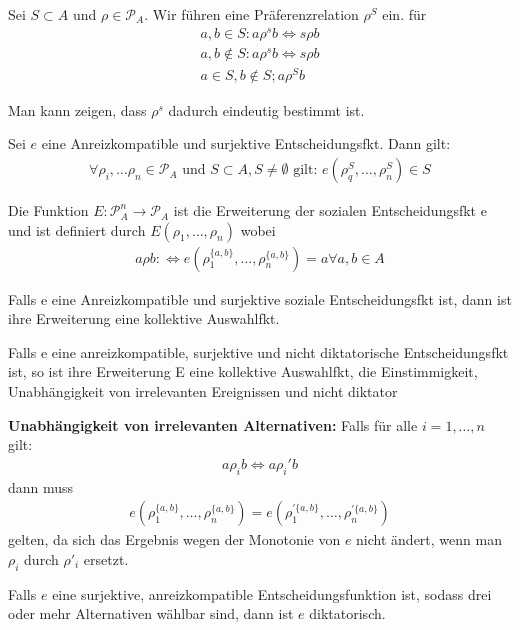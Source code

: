 \begin{defi}
	Sei $S \subset A$ und $\rho \in \mathcal{P}_A$. Wir führen eine Präferenzrelation $\rho^S$ ein. für 
	\begin{align*}
		a,b \in S: a \rho^s b \Leftrightarrow s \rho b \\
		a,b \notin S: a \rho^s b \Leftrightarrow s \rho b \\
		a \in S, b \notin S; a \rho^S b
	\end{align*}
\end{defi}
Man kann zeigen, dass $\rho^s$ dadurch eindeutig bestimmt ist. 

\begin{lem}
	Sei $e$ eine Anreizkompatible und surjektive Entscheidungsfkt. Dann gilt: 
	\begin{align*}
		\forall \rho_i, \dots \rho_n \in \mathcal{P}_A \text{ und } S \subset A, S \neq \emptyset \text{ gilt: } e(\rho_q^S, \dots, \rho_n^S) \in S
	\end{align*}
\end{lem}

\begin{defi}
	Die Funktion $E: \mathcal{P}_A^n \rightarrow \mathcal{P}_A$ ist die Erweiterung der sozialen Entscheidungsfkt e und ist definiert durch $E(\rho_1, \dots, \rho_n)$ wobei 
	\begin{align*}
		a \rho b : \Leftrightarrow e(\rho_1^{\{a,b\}} , \dots, \rho_n^{\{a,b\}})=a \forall a,b \in A
	\end{align*}
\end{defi}

\begin{lem}
	Falls e eine Anreizkompatible und surjektive soziale Entscheidungsfkt ist, dann ist ihre Erweiterung eine kollektive Auswahlfkt. 
\end{lem}

\begin{lem}[Erweiterungslemma]
	Falls e eine anreizkompatible, surjektive und nicht diktatorische Entscheidungsfkt ist, so ist ihre Erweiterung E eine kollektive Auswahlfkt, die Einstimmigkeit, Unabhängigkeit von irrelevanten Ereignissen und nicht diktator
\end{lem}

\textbf{Unabhängigkeit von irrelevanten Alternativen: } Falls für alle $i=1, \dots, n$ gilt:
\begin{align*}
	a \rho_i b \Leftrightarrow a \rho_i' b
\end{align*}
dann muss 
\begin{align*}
	e(\rho_1^{ \{ a, b \} }, \dots , \rho_n^{\{ a, b\} })= e(\rho_1^{' \{ a, b\} }, \dots , \rho_n^{' \{ a, b\} })
\end{align*}
gelten, da sich das Ergebnis wegen der Monotonie von $e$ nicht ändert, wenn man $\rho_i$ durch $\rho'_i$ ersetzt. 

\begin{thm}
	Falls $e$ eine surjektive, anreizkompatible Entscheidungsfunktion ist, sodass drei oder mehr Alternativen wählbar sind, dann ist $e$ diktatorisch. 
\end{thm} 



